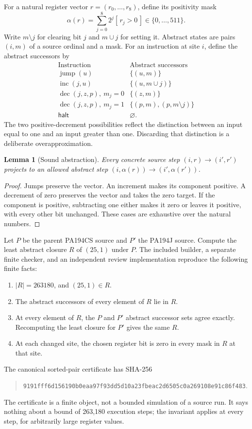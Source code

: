 \documentclass[11pt,letterpaper]{article}
\newtheorem{lemma}[theorem]{Lemma}
\begin{document}
For a natural register vector \(r=(r_0,\ldots,r_8)\), define its positivity
mask
\[
 \alpha(r)=\sum_{j=0}^{8}2^j[\,r_j>0\,]\in\{0,\ldots,511\}.
\]
Write \(m\setminus j\) for clearing bit \(j\) and \(m\cup j\) for
setting it. Abstract states are pairs \((i,m)\) of a source ordinal and a
mask. For an instruction at site \(i\), define the abstract successors by
\[
\begin{array}{c|l}
\text{Instruction}&\text{Abstract successors}\\ \hline
\operatorname{jump}(u)&\{(u,m)\}\\
\operatorname{inc}(j,u)&\{(u,m\cup j)\}\\
\operatorname{dec}(j,z,p),\ m_j=0&\{(z,m)\}\\
\operatorname{dec}(j,z,p),\ m_j=1&\{(p,m),(p,m\setminus j)\}\\
\mathsf{halt}&\varnothing.
\end{array}
\]
The two positive-decrement possibilities reflect the distinction between
an input equal to one and an input greater than one. Discarding that
distinction is a deliberate overapproximation.

\begin{lemma}[Sound abstraction]
Every concrete source step \((i,r)\to(i',r')\) projects to an allowed
abstract step \((i,\alpha(r))\to(i',\alpha(r'))\).
\end{lemma}
\begin{proof}
Jumps preserve the vector. An increment makes its component positive.
A decrement of zero preserves the vector and takes the zero target.
If the component is positive, subtracting one either makes it zero or
leaves it positive, with every other bit unchanged. These cases are
exhaustive over the natural numbers.
\end{proof}

Let \(P\) be the parent PA194CS source and \(P'\) the PA194J source.
Compute the least abstract closure \(R\) of \((25,1)\) under \(P\).
The included builder, a separate finite checker, and an independent
review implementation reproduce the following finite facts:
\begin{enumerate}
\item \(|R|=263180\), and \((25,1)\in R\).
\item The abstract successors of every element of \(R\) lie in \(R\).
\item At every element of \(R\), the \(P\) and \(P'\) abstract successor
      sets agree exactly. Recomputing the least closure for \(P'\) gives
      the same \(R\).
\item At each changed site, the chosen register bit is zero in every
      mask in \(R\) at that site.
\end{enumerate}
The canonical sorted-pair certificate has SHA-256
\begin{quote}\small
\nolinkurl{9191fff6d156190b0eaa97f93dd5d10a23fbeac2d6505c0a269108e91c86f483}.
\end{quote}
The certificate is a finite object, not a bounded simulation of a source
run. It says nothing about a bound of 263,180 execution steps; the
invariant applies at every step, for arbitrarily large register values.
\end{document}

